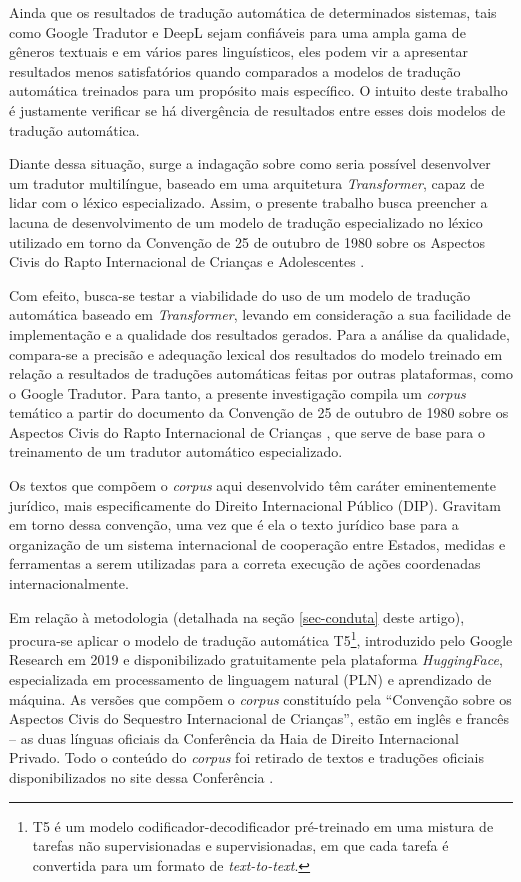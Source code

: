 \documentclass[portuguese]{textolivre}
\begin{document}
Ainda que os resultados de tradução automática de determinados sistemas, tais como Google Tradutor e DeepL sejam confiáveis para uma ampla gama de gêneros textuais e em vários pares linguísticos, eles podem vir a apresentar resultados menos satisfatórios quando comparados a modelos de tradução automática treinados para um propósito mais específico. O intuito deste trabalho é justamente verificar se há divergência de resultados entre esses dois modelos de tradução automática.

Diante dessa situação, surge a indagação sobre como seria possível desenvolver um tradutor multilíngue, baseado em uma arquitetura \textit{Transformer}, capaz de lidar com o léxico especializado. Assim, o presente trabalho busca preencher a lacuna de desenvolvimento de um modelo de tradução especializado no léxico utilizado em torno da Convenção de 25 de outubro de 1980 sobre os Aspectos Civis do Rapto Internacional de Crianças e Adolescentes \cite{hcch_convention_1980}.

Com efeito, busca-se testar a viabilidade do uso de um modelo de tradução automática baseado em \textit{Transformer}, levando em consideração a sua facilidade de implementação e a qualidade dos resultados gerados. Para a análise da qualidade, compara-se a precisão e adequação lexical dos resultados do modelo treinado em relação a resultados de traduções automáticas feitas por outras plataformas, como o Google Tradutor. Para tanto, a presente investigação compila um \textit{corpus} temático a partir do documento da Convenção de 25 de outubro de 1980 sobre os Aspectos Civis do Rapto Internacional de Crianças \cite{hcch_convention_1980}, que serve de base para o treinamento de um tradutor automático especializado.

Os textos que compõem o \textit{corpus} aqui desenvolvido têm caráter eminentemente jurídico, mais especificamente do Direito Internacional Público (DIP). Gravitam em torno dessa convenção, uma vez que é ela o texto jurídico base para a organização de um sistema internacional de cooperação entre Estados, medidas e ferramentas a serem utilizadas para a correta execução de ações coordenadas internacionalmente.

Em relação à metodologia (detalhada na seção \ref{sec-conduta} deste artigo), procura-se aplicar o modelo de tradução automática T5\footnote{T5 é um modelo codificador-decodificador pré-treinado em uma mistura de tarefas não supervisionadas e supervisionadas, em que cada tarefa é convertida para um formato de \textit{text-to-text}.}, introduzido pelo Google Research em 2019 \cite{raffel_exploring_2020} e disponibilizado gratuitamente pela plataforma \textit{HuggingFace}, especializada em processamento de linguagem natural (PLN) e aprendizado de máquina. As versões que compõem o \textit{corpus} constituído pela “Convenção sobre os Aspectos Civis do Sequestro Internacional de Crianças”, estão em inglês e francês – as duas línguas oficiais da Conferência da Haia de Direito Internacional Privado. Todo o conteúdo do \textit{corpus} foi retirado de textos e traduções oficiais disponibilizados no site dessa Conferência \cite{perez-vera_hcch_1980,hcch_convention_1980,hcch_guide_2003a,hcch_guide_2003b,hcch_guide_2005,hcch_guide_2010,hcch_guide_2012}.
 
\end{document}
